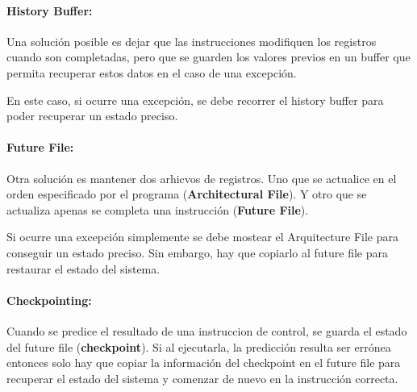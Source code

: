 \paragraph{History Buffer:} Una solución posible es dejar que las instrucciones modifiquen los registros cuando son completadas, pero que se guarden los valores previos en un buffer que permita recuperar estos datos en el caso de una excepción.

En este caso, si ocurre una excepción, se debe recorrer el history buffer para poder recuperar un estado preciso.

\paragraph{Future File:} Otra solución es mantener dos arhicvos de registros. Uno que se actualice en el orden especificado por el programa (\textbf{Architectural File}). Y otro que se actualiza apenas se completa una instrucción (\textbf{Future File}).

Si ocurre una excepción simplemente se debe mostear el Arquitecture File para conseguir un estado preciso. Sin embargo, hay que copiarlo al future file para restaurar el estado del sistema.

\paragraph{Checkpointing:} Cuando se predice el resultado de una instruccion de control, se guarda el estado del future file (\textbf{checkpoint}). Si al ejecutarla, la predicción resulta ser errónea entonces solo hay que copiar la información del checkpoint en el future file para recuperar el estado del sistema y comenzar de nuevo en la instrucción correcta.  
